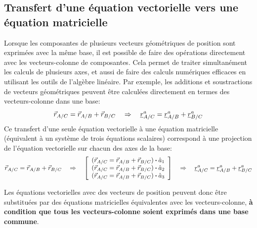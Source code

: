 \subsection{Transfert d'une équation vectorielle vers une équation matricielle}
%
Lorsque les composantes de plusieurs vecteurs géométriques de position sont exprimées avec la même base, il est possible de faire des opérations directement avec les vecteurs-colonne de composantes. Cela permet de traiter simultanément les calculs de plusieurs axes, et aussi de faire des calculs numériques efficaces en utilisant les outils de l'algèbre linéaire. Par exemple, les additions et soustractions de vecteurs géométriques peuvent être calculées directement en termes des vecteurs-colonne dans une base:
\begin{equation}
	\vec{r}_{A/C}   = \vec{r}_{A/B} + \vec{r}_{B/C}   \quad \Rightarrow \quad
	\underline{r}_{A/C}^a = \underline{r}_{A/B}^a + \underline{r}_{B/C}^a
\end{equation}
Ce transfert d'une seule équation vectorielle à une équation matricielle (équivalent à un système de trois équations scalaires) correspond à une projection de l'équation vectorielle sur chacun des axes de la base:
\begin{equation}
	\vec{r}_{A/C}   = \vec{r}_{A/B} + \vec{r}_{B/C}
	\quad \Rightarrow \quad
	\left[ \begin{array}{c} (\vec{r}_{A/C}   = \vec{r}_{A/B} + \vec{r}_{B/C}   ) \boldsymbol{\cdot} \hat{a}_1 \\ (\vec{r}_{A/C}   = \vec{r}_{A/B} + \vec{r}_{B/C}   ) \boldsymbol{\cdot} \hat{a}_2 \\ (\vec{r}_{A/C}   = \vec{r}_{A/B} + \vec{r}_{B/C}  ) \boldsymbol{\cdot} \hat{a}_3  \end{array} \right]
	\quad \Rightarrow \quad
	\underline{r}_{A/C}^a = \underline{r}_{A/B}^a + \underline{r}_{B/C}^a
\end{equation}

Les équations vectorielles avec des vecteurs de position peuvent donc être substituées par des équations matricielles équivalentes avec les vecteurs-colonne,\textbf{ à condition que tous les vecteurs-colonne soient exprimés dans une base commune}.




